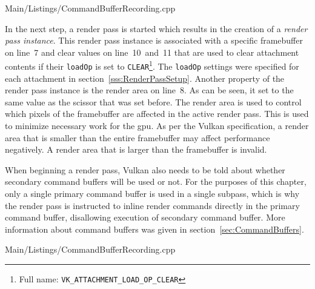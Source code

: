       
      {Main/Listings/CommandBufferRecording.cpp}

      In the next step, a render pass is started which results in the creation of a \textit{render pass instance}.
      This render pass instance is associated with a specific framebuffer on line~7 and clear values on line~10~and~11 that are used to clear attachment contents if their \lstinline{loadOp} is set to \lstinline{CLEAR}\footnote{Full name: \lstinline{VK_ATTACHMENT_LOAD_OP_CLEAR}}.
      The \lstinline{loadOp} settings were specified for each attachment in section~\ref{sss:RenderPassSetup}.
      Another property of the render pass instance is the render area on line~8.
      As can be seen, it set to the same value as the scissor that was set before.
      The render area is used to control which pixels of the framebuffer are affected in the active render pass.
      This is used to minimize necessary work for the \gls{gpu}.
      As per the Vulkan specification, a render area that is smaller than the entire framebuffer may affect performance negatively.
      A render area that is larger than the framebuffer is invalid.

      When beginning a render pass, Vulkan also needs to be told about whether secondary command buffers will be used or not.
      For the purposes of this chapter, only a single primary command buffer is used in a single subpass, which is why the render pass is instructed to inline render commands directly in the primary command buffer, disallowing execution of secondary command buffer.
      More information about command buffers was given in section~\ref{sec:CommandBuffers}.


      
      {Main/Listings/CommandBufferRecording.cpp}


